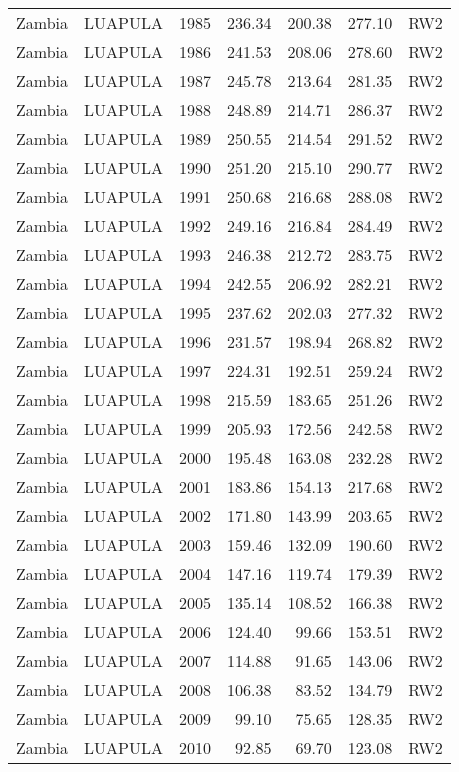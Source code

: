 \begin{longtable}{lllrrrl}
  Zambia & LUAPULA & 1985 & 236.34 & 200.38 & 277.10 & RW2 \\ 
  Zambia & LUAPULA & 1986 & 241.53 & 208.06 & 278.60 & RW2 \\ 
  Zambia & LUAPULA & 1987 & 245.78 & 213.64 & 281.35 & RW2 \\ 
  Zambia & LUAPULA & 1988 & 248.89 & 214.71 & 286.37 & RW2 \\ 
  Zambia & LUAPULA & 1989 & 250.55 & 214.54 & 291.52 & RW2 \\ 
  Zambia & LUAPULA & 1990 & 251.20 & 215.10 & 290.77 & RW2 \\ 
  Zambia & LUAPULA & 1991 & 250.68 & 216.68 & 288.08 & RW2 \\ 
  Zambia & LUAPULA & 1992 & 249.16 & 216.84 & 284.49 & RW2 \\ 
  Zambia & LUAPULA & 1993 & 246.38 & 212.72 & 283.75 & RW2 \\ 
  Zambia & LUAPULA & 1994 & 242.55 & 206.92 & 282.21 & RW2 \\ 
  Zambia & LUAPULA & 1995 & 237.62 & 202.03 & 277.32 & RW2 \\ 
  Zambia & LUAPULA & 1996 & 231.57 & 198.94 & 268.82 & RW2 \\ 
  Zambia & LUAPULA & 1997 & 224.31 & 192.51 & 259.24 & RW2 \\ 
  Zambia & LUAPULA & 1998 & 215.59 & 183.65 & 251.26 & RW2 \\ 
  Zambia & LUAPULA & 1999 & 205.93 & 172.56 & 242.58 & RW2 \\ 
  Zambia & LUAPULA & 2000 & 195.48 & 163.08 & 232.28 & RW2 \\ 
  Zambia & LUAPULA & 2001 & 183.86 & 154.13 & 217.68 & RW2 \\ 
  Zambia & LUAPULA & 2002 & 171.80 & 143.99 & 203.65 & RW2 \\ 
  Zambia & LUAPULA & 2003 & 159.46 & 132.09 & 190.60 & RW2 \\ 
  Zambia & LUAPULA & 2004 & 147.16 & 119.74 & 179.39 & RW2 \\ 
  Zambia & LUAPULA & 2005 & 135.14 & 108.52 & 166.38 & RW2 \\ 
  Zambia & LUAPULA & 2006 & 124.40 & 99.66 & 153.51 & RW2 \\ 
  Zambia & LUAPULA & 2007 & 114.88 & 91.65 & 143.06 & RW2 \\ 
  Zambia & LUAPULA & 2008 & 106.38 & 83.52 & 134.79 & RW2 \\ 
  Zambia & LUAPULA & 2009 & 99.10 & 75.65 & 128.35 & RW2 \\ 
  Zambia & LUAPULA & 2010 & 92.85 & 69.70 & 123.08 & RW2 \\ 

\end{longtable}
